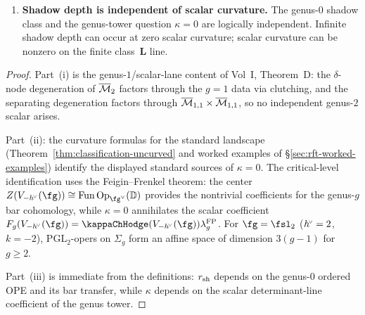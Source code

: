 \begin{theorem}
\begin{enumerate}[label=\textup{(\roman*)}]
\begin{enumerate}[label=\textup{(\alph*)}]
 \item \emph{Degenerately uncurved} \textup{(}resonance regime\textup{)}:
 $\kappa = 0$ from parameter specialisation
 ($\mathrm{Vir}_0$, $\cW$-algebras at $c_{\mathrm{DS}} = 0$).
 Curvature vanishes, scalar genus amplitudes vanish, but the
 non-scalar shadow obstruction tower may be nontrivial.
 Shadow depth remains the class~$\mathbf M$ value
 $\dalg=\infty$ when the Virasoro wheel tower survives.
 \end{enumerate}
\item \textbf{Shadow depth is independent of scalar curvature.}
 The genus-$0$ shadow class and the genus-tower question
 $\kappa = 0$ are logically independent. Infinite shadow depth
 can occur at zero scalar curvature; scalar curvature can be
 nonzero on the finite class~$\mathbf L$ line.
\end{enumerate}
\end{theorem}

\begin{proof}
Part~(i) is the genus-$1$/scalar-lane content of Vol~I, Theorem~D:
the $\delta$-node degeneration
of $\overline{\mathcal{M}}_2$ factors through the $g = 1$ data via
clutching, and the separating degeneration factors through
$\overline{\mathcal{M}}_{1,1} \times \overline{\mathcal{M}}_{1,1}$, so no
independent genus-$2$ scalar arises.

Part~(ii): the curvature formulas for the standard landscape
(Theorem~\ref{thm:classification-uncurved} and worked examples
of \S\ref{sec:rft-worked-examples}) identify the displayed
standard sources of $\kappa = 0$. The critical-level identification
uses the Feigin--Frenkel theorem: the center
$Z(V_{-\hvee}(\fg)) \cong \mathrm{Fun}\,\mathrm{Op}_{\fg^\vee}
(\mathbb{D})$ provides the nontrivial coefficients for the
genus-$g$ bar cohomology, while $\kappa = 0$ annihilates the
scalar coefficient
$F_g(V_{-\hvee}(\fg))
=\kappaChHodge(V_{-\hvee}(\fg))\lambda_g^{\mathrm{FP}}$.
For $\fg = \fsl_2$ ($h^{\!\scriptscriptstyle\vee} = 2$, $k = -2$),
$\mathrm{PGL}_2$-opers on $\Sigma_g$ form an affine space of
dimension $3(g-1)$ for $g \geq 2$.

Part~(iii) is immediate from the definitions: $r_{\mathrm{sh}}$ depends on
the genus-$0$ ordered OPE and its bar transfer, while $\kappa$
depends on the scalar determinant-line coefficient of the genus tower.
\end{proof}

